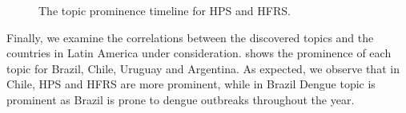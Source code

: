 \documentclass[twoside,leqno,twocolumn]{article}
\begin{document}
\begin{figure}[h]
\captionsetup{font=small}
\begin{center}
\end{center}
\vspace{-20pt}
\caption{The topic prominence timeline for HPS and HFRS.}
\vspace{-10pt}
\label{fig:topics_timelines}
\end{figure}

Finally, we examine the correlations between the discovered topics and the countries in Latin America under consideration.  shows the prominence of each topic for Brazil, Chile, Uruguay and Argentina. As expected, we observe that in Chile, HPS and HFRS are more prominent, while in Brazil Dengue topic is prominent as Brazil is prone to dengue outbreaks throughout the year.
\end{document}
